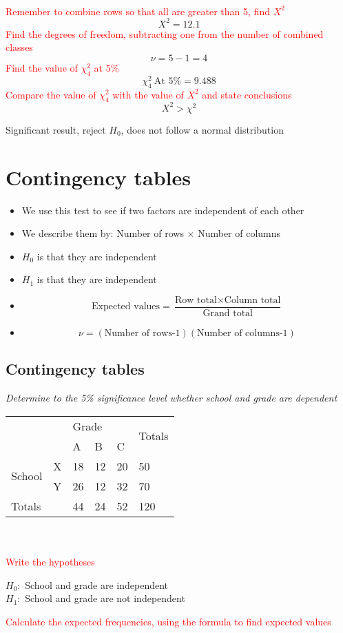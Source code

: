 \documentclass{article}[18pt]
\begin{document}
\\
\textcolor{red}{Remember to combine rows so that all are greater than 5, find $X^2$}
$$X^2=12.1$$
\textcolor{red}{Find the degrees of freedom, subtracting one from the number of combined classes}
$$\nu=5-1=4$$
\textcolor{red}{Find the value of $\chi^2_4$ at 5\%}
$$\chi^2_4 \ \textrm{At 5\%}=9.488$$
\textcolor{red}{Compare the value of $\chi^2_4$ with the value of $X^2$ and state conclusions}
$$X^2>\chi^2$$
\begin{center}
Significant result, reject $H_0$, does not follow a normal distribution
\end{center}
\newpage
\section{Contingency tables}
\begin{itemize}
\item We use this test to see if two factors are independent of each other
\item We describe them by: Number of rows $\times$ Number of columns
\item $H_0$ is that they are independent
\item $H_1$ is that they are independent
\item $$\textrm{Expected values}=\frac{\textrm{Row total}\times\textrm{Column total}}{\textrm{Grand total}}$$
\item $$\nu=(\textrm{Number of rows-1})(\textrm{Number of columns-1})$$
\end{itemize}
\subsection{Contingency tables}
\textit{Determine to the 5\% significance level whether school and grade are dependent}\\

\begin{tabularx}{\textwidth}{|X|X|X|X|X|X|}
\hline
&&\multicolumn{3}{|X|}{Grade}&\multirow{2}{4em}{Totals}\\
\cline{3-5}
&&A&B&C&\\
\hline
\multirow{2}{4em}{School}&X&18&12&20&50\\
\cline{2-6}
&Y&26&12&32&70\\
\hline
Totals&&44&24&52&120\\
\hline
\end{tabularx}
\\
\\
\textcolor{red}{Write the hypotheses}
\begin{center}
$H_0:$ School and grade are independent\\
$H_1:$ School and grade are not independent\\
\end{center}
\textcolor{red}{Calculate the expected frequencies, using the formula to find expected values}\\
\end{document}
